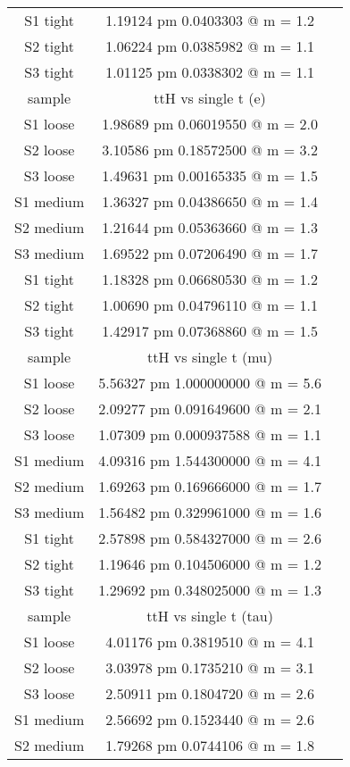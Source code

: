\documentclass[12pt,a4paper,twoside,english]{report}
\begin{document}
\begin{table}[h!]
\begin{tabular}{||c|c|c||}
    S1 tight  & 1.19124 pm 0.0403303 @ m = 1.2\\
    S2 tight  & 1.06224 pm 0.0385982 @ m = 1.1\\
    S3 tight  & 1.01125 pm 0.0338302 @ m = 1.1\\
    \hline
    \hline
    sample & ttH vs single t (e)\\
    \hline
    S1 loose  & 1.98689 pm 0.06019550 @ m = 2.0\\
    S2 loose  & 3.10586 pm 0.18572500 @ m = 3.2\\ 
    S3 loose  & 1.49631 pm 0.00165335 @ m = 1.5\\
    S1 medium & 1.36327 pm 0.04386650 @ m = 1.4\\
    S2 medium & 1.21644 pm 0.05363660 @ m = 1.3\\
    S3 medium & 1.69522 pm 0.07206490 @ m = 1.7\\
    S1 tight  & 1.18328 pm 0.06680530 @ m = 1.2\\
    S2 tight  & 1.00690 pm 0.04796110 @ m = 1.1\\
    S3 tight  & 1.42917 pm 0.07368860 @ m = 1.5\\
    \hline
    \hline
    sample & ttH vs single t (mu)\\
    \hline
    S1 loose  & 5.56327 pm 1.000000000 @ m = 5.6\\
    S2 loose  & 2.09277 pm 0.091649600 @ m = 2.1\\ 
    S3 loose  & 1.07309 pm 0.000937588 @ m = 1.1\\
    S1 medium & 4.09316 pm 1.544300000 @ m = 4.1\\
    S2 medium & 1.69263 pm 0.169666000 @ m = 1.7\\
    S3 medium & 1.56482 pm 0.329961000 @ m = 1.6\\
    S1 tight  & 2.57898 pm 0.584327000 @ m = 2.6\\
    S2 tight  & 1.19646 pm 0.104506000 @ m = 1.2\\
    S3 tight  & 1.29692 pm 0.348025000 @ m = 1.3\\
    \hline
    \hline
    sample & ttH vs single t (tau)\\
    \hline
    S1 loose  & 4.01176 pm 0.3819510 @ m = 4.1\\
    S2 loose  & 3.03978 pm 0.1735210 @ m = 3.1\\ 
    S3 loose  & 2.50911 pm 0.1804720 @ m = 2.6\\
    S1 medium & 2.56692 pm 0.1523440 @ m = 2.6\\
    S2 medium & 1.79268 pm 0.0744106 @ m = 1.8\\

\end{tabular}
\end{table}
\end{document}
